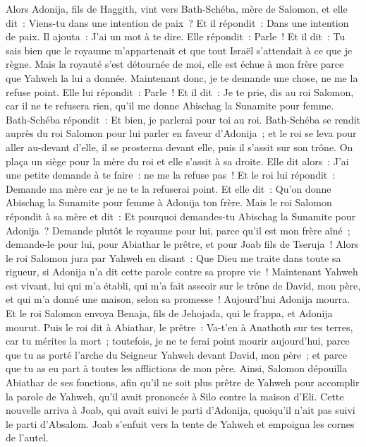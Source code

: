\begin{multicols}{2}
Alors Adonija, fils de Haggith, vint vers Bath-Schéba, mère de Salomon, et elle dit~: Viens-tu dans une intention de paix~? Et il répondit~: Dans une intention de paix.
Il ajouta~: J'ai un mot à te dire. Elle répondit~: Parle~!
Et il dit~: Tu sais bien que le royaume m'appartenait et que tout Israël s'attendait à ce que je règne. Mais la royauté s'est détournée de moi, elle est échue à mon frère parce que Yahweh la lui a donnée.
Maintenant donc, je te demande une chose, ne me la refuse point. Elle lui répondit~: Parle~!
Et il dit~: Je te prie, dis au roi Salomon, car il ne te refusera rien, qu'il me donne Abischag la Sunamite pour femme.
Bath-Schéba répondit~: Et bien, je parlerai pour toi au roi.
Bath-Schéba se rendit auprès du roi Salomon pour lui parler en faveur d'Adonija~; et le roi se leva pour aller au-devant d'elle, il se prosterna devant elle, puis il s'assit sur son trône. On plaça un siège pour la mère du roi et elle s'assit à sa droite.
Elle dit alors~: J'ai une petite demande à te faire~: ne me la refuse pas~! Et le roi lui répondit~: Demande ma mère car je ne te la refuserai point.
Et elle dit~: Qu'on donne Abischag la Sunamite pour femme à Adonija ton frère.
Mais le roi Salomon répondit à sa mère et dit~: Et pourquoi demandes-tu Abischag la Sunamite pour Adonija~? Demande plutôt le royaume pour lui, parce qu'il est mon frère aîné~; demande-le pour lui, pour Abiathar le prêtre, et pour Joab fils de Tseruja~!
Alors le roi Salomon jura par Yahweh en disant~: Que Dieu me traite dans toute sa rigueur, si Adonija n'a dit cette parole contre sa propre vie~!
Maintenant Yahweh est vivant, lui qui m'a établi, qui m'a fait asseoir sur le trône de David, mon père, et qui m'a donné une maison, selon sa promesse~! Aujourd'hui Adonija mourra.
Et le roi Salomon envoya Benaja, fils de Jehojada, qui le frappa, et Adonija mourut.
Puis le roi dit à Abiathar, le prêtre~: Va-t'en à Anathoth sur tes terres, car tu mérites la mort~; toutefois, je ne te ferai point mourir aujourd'hui, parce que tu as porté l'arche du Seigneur Yahweh devant David, mon père~; et parce que tu as eu part à toutes les afflictions de mon père.
Ainsi, Salomon dépouilla Abiathar de ses fonctions, afin qu'il ne soit plus prêtre de Yahweh pour accomplir la parole de Yahweh, qu'il avait prononcée à Silo contre la maison d'Eli.
Cette nouvelle arriva à Joab, qui avait suivi le parti d'Adonija, quoiqu'il n'ait pas suivi le parti d'Absalom. Joab s'enfuit vers la tente de Yahweh et empoigna les cornes de l'autel.

\end{multicols}
